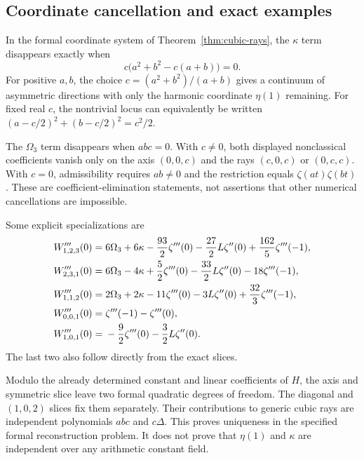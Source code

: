 \subsection{Coordinate cancellation and exact examples}

In the formal coordinate system of Theorem~\ref{thm:cubic-rays},
the $\kappa$ term disappears exactly when
\begin{equation}\label{ray:conic}
 c\bigl(a^2+b^2-c(a+b)\bigr)=0.
\end{equation}
For positive $a,b$, the choice
$c=(a^2+b^2)/(a+b)$ gives a continuum of asymmetric directions with
only the harmonic coordinate $\eta(1)$ remaining. For fixed real
$c$, the nontrivial locus can equivalently be written
$(a-c/2)^2+(b-c/2)^2=c^2/2$.

The $\Omega_3$ term disappears when $abc=0$. With $c\ne0$, both
displayed nonclassical coefficients vanish only on the axis
$(0,0,c)$ and the rays $(c,0,c)$ or $(0,c,c)$. With $c=0$,
admissibility requires $ab\ne0$ and the restriction equals
$\zeta(at)\zeta(bt)$. These are coefficient-elimination statements,
not assertions that other numerical cancellations are impossible.

Some explicit specializations are
\begin{align}
 W_{1,2,3}'''(0)={}&6\Omega_3+6\kappa
       -\frac{93}{2}\zeta'''(0)-\frac{27}{2}L\zeta''(0)
       +\frac{162}{5}\zeta'''(-1),\label{ray:123}\\
 W_{2,3,1}'''(0)={}&6\Omega_3-4\kappa
       +\frac52\zeta'''(0)-\frac{33}{2}L\zeta''(0)
       -18\zeta'''(-1),\label{ray:231}\\
 W_{1,1,2}'''(0)={}&2\Omega_3+2\kappa
       -11\zeta'''(0)-3L\zeta''(0)+\frac{32}{3}\zeta'''(-1),\notag\\
 W_{0,0,1}'''(0)={}&\zeta'''(-1)-\zeta'''(0),\notag\\
 W_{1,0,1}'''(0)={}&-\frac92\zeta'''(0)-\frac32L\zeta''(0).
\end{align}
The last two also follow directly from the exact slices.

\begin{remark}
Modulo the already determined constant and linear coefficients of
$H$, the axis and symmetric slice leave two formal quadratic degrees
of freedom. The diagonal and $(1,0,2)$ slices fix them separately.
Their contributions to generic cubic rays are independent polynomials
$abc$ and $c\Delta$. This proves uniqueness in the specified formal
reconstruction problem. It does not prove that $\eta(1)$ and $\kappa$
are independent over any arithmetic constant field.
\end{remark}
